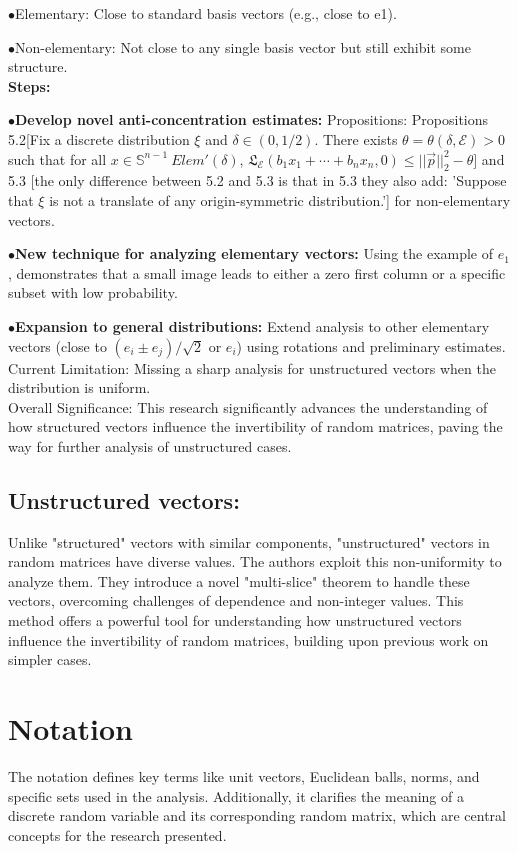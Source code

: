 \documentclass{article}
\begin{document}
$\bullet${Elementary: Close to standard basis vectors (e.g., close to e1).}

$\bullet${Non-elementary: Not close to any single basis vector but still exhibit some structure.}\\
\textbf{Steps:}

$\bullet${\textbf{Develop novel anti-concentration estimates:} Propositions: Propositions 5.2[Fix a discrete distribution $\xi$ and $\delta \in (0, 1/2)$. There exists $\theta = \theta(\delta, \mathcal{E}) > 0$ such that for all $x \in \mathbb{S}^{n-1}\ Elem'(\delta) $, $\mathfrak{L}_\mathcal{E}(b_1x_1+\cdots+b_nx_n,0)\leq ||\overrightarrow{p}||_2^2-\theta]$ 
and 5.3 [the only difference between 5.2 and 5.3 is that in 5.3 they also add: 'Suppose that $\xi$ is not a translate of any origin-symmetric distribution.'] for non-elementary vectors.}

$\bullet${\textbf{New technique for analyzing elementary vectors:} Using the example of $e_1$, demonstrates that a small image leads to either a zero first column or a specific subset with low probability.}

$\bullet${\textbf{Expansion to general distributions:} Extend analysis to other elementary vectors (close to $(e_i \pm e_j)/\sqrt{2}$ or $e_i$) using rotations and preliminary estimates.}\\
Current Limitation: Missing a sharp analysis for unstructured vectors when the distribution is uniform.\\
Overall Significance: This research significantly advances the understanding of how structured vectors influence the invertibility of random matrices, paving the way for further analysis of unstructured cases.
\subsection{Unstructured vectors:}
Unlike "structured" vectors with similar components, "unstructured" vectors in random matrices have diverse values. The authors exploit this non-uniformity to analyze them. They introduce a novel "multi-slice" theorem to handle these vectors, overcoming challenges of dependence and non-integer values. This method offers a powerful tool for understanding how unstructured vectors influence the invertibility of random matrices, building upon previous work on simpler cases.
\section{Notation}
The notation defines key terms like unit vectors, Euclidean balls, norms, and specific sets used in the analysis.
Additionally, it clarifies the meaning of a discrete random variable and its corresponding random matrix, which are central concepts for the research presented.
\end{document}
